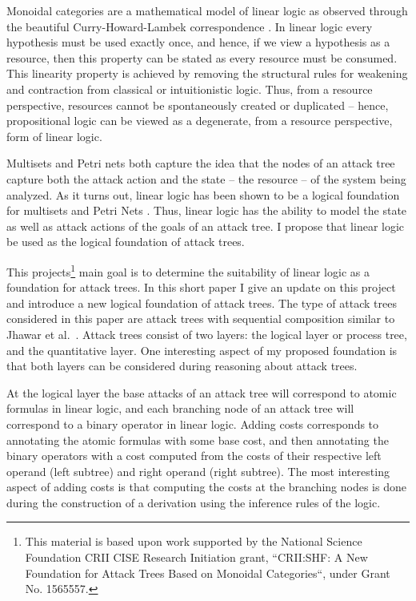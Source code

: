 \documentclass{llncs}
\begin{document}
Monoidal categories are a mathematical model of linear logic as
observed through the beautiful Curry-Howard-Lambek correspondence
\cite{Mellies:2009}.  In linear logic every hypothesis must be used
exactly once, and hence, if we view a hypothesis as a resource, then
this property can be stated as every resource must be consumed.  This
linearity property is achieved by removing the structural rules for
weakening and contraction from classical or intuitionistic logic.
Thus, from a resource perspective, resources cannot be spontaneously
created or duplicated -- hence, propositional logic can be viewed as a
degenerate, from a resource perspective, form of linear logic.

Multisets and Petri nets both capture the idea that the nodes of an
attack tree capture both the attack action and the state -- the
resource -- of the system being analyzed. As it turns out, linear
logic has been shown to be a logical foundation for multisets
\cite{Tzouvaras:1998} and Petri Nets \cite{Brown:1991}.  Thus, linear
logic has the ability to model the state as well as attack actions of
the goals of an attack tree.  I propose that linear logic be used as
the logical foundation of attack trees.

This projects\footnote{This material is based upon work supported by
  the National Science Foundation CRII CISE Research Initiation grant,
  ``CRII:SHF: A New Foundation for Attack Trees Based on Monoidal
  Categories``, under Grant No. 1565557.} main goal is to determine
the suitability of linear logic as a foundation for attack trees.  In
this short paper I give an update on this project and introduce a new
logical foundation of attack trees. The type of attack trees
considered in this paper are attack trees with sequential composition
similar to Jhawar et al.~\cite{Jhawar:2015}.  Attack trees consist of
two layers: the logical layer or process tree, and the quantitative
layer.  One interesting aspect of my proposed foundation is that both
layers can be considered during reasoning about attack trees.

At the logical layer the base attacks of an attack tree will
correspond to atomic formulas in linear logic, and each branching node
of an attack tree will correspond to a binary operator in linear
logic.  Adding costs corresponds to annotating the atomic formulas
with some base cost, and then annotating the binary operators with a
cost computed from the costs of their respective left operand (left
subtree) and right operand (right subtree).  The most interesting
aspect of adding costs is that computing the costs at the branching
nodes is done during the construction of a derivation using the
inference rules of the logic.
\end{document}
